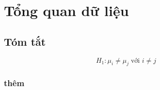 \section{Tổng quan dữ liệu}
\subsection{Tóm tắt}
$$H_1: \mu_i \neq \mu_j \; \text{với } i \neq j$$
\subsubsection{thêm}